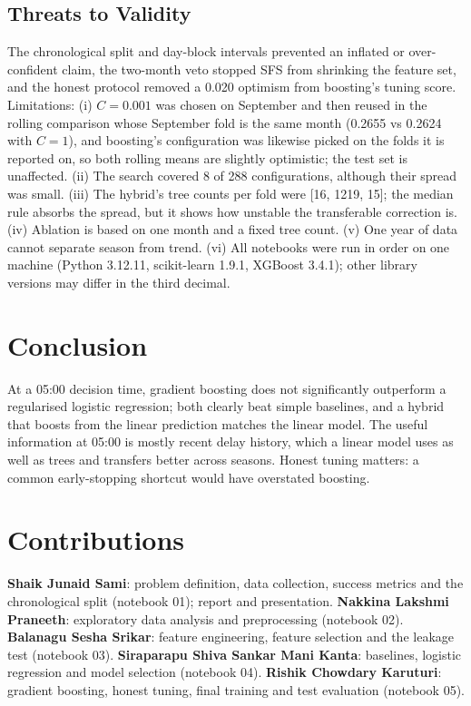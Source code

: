 \documentclass[conference]{IEEEtran}
\begin{document}
\subsection{Threats to Validity}
The chronological split and day-block intervals prevented an inflated or over-confident claim, the two-month veto stopped SFS from shrinking the feature set, and the honest protocol removed a 0.020 optimism from boosting's tuning score. Limitations: (i) $C=0.001$ was chosen on September and then reused in the rolling comparison whose September fold is the same month (0.2655 vs 0.2624 with $C=1$), and boosting's configuration was likewise picked on the folds it is reported on, so both rolling means are slightly optimistic; the test set is unaffected. (ii) The search covered 8 of 288 configurations, although their spread was small. (iii) The hybrid's tree counts per fold were [16, 1219, 15]; the median rule absorbs the spread, but it shows how unstable the transferable correction is. (iv) Ablation is based on one month and a fixed tree count. (v) One year of data cannot separate season from trend. (vi) All notebooks were run in order on one machine (Python 3.12.11, scikit-learn 1.9.1, XGBoost 3.4.1); other library versions may differ in the third decimal.

\section{Conclusion}
At a 05:00 decision time, gradient boosting does not significantly outperform a regularised logistic regression; both clearly beat simple baselines, and a hybrid that boosts from the linear prediction matches the linear model. The useful information at 05:00 is mostly recent delay history, which a linear model uses as well as trees and transfers better across seasons. Honest tuning matters: a common early-stopping shortcut would have overstated boosting.

\section*{Contributions}
\textbf{Shaik Junaid Sami}: problem definition, data collection, success metrics and the chronological split (notebook 01); report and presentation. \textbf{Nakkina Lakshmi Praneeth}: exploratory data analysis and preprocessing (notebook 02). \textbf{Balanagu Sesha Srikar}: feature engineering, feature selection and the leakage test (notebook 03). \textbf{Siraparapu Shiva Sankar Mani Kanta}: baselines, logistic regression and model selection (notebook 04). \textbf{Rishik Chowdary Karuturi}: gradient boosting, honest tuning, final training and test evaluation (notebook 05).
\end{document}
